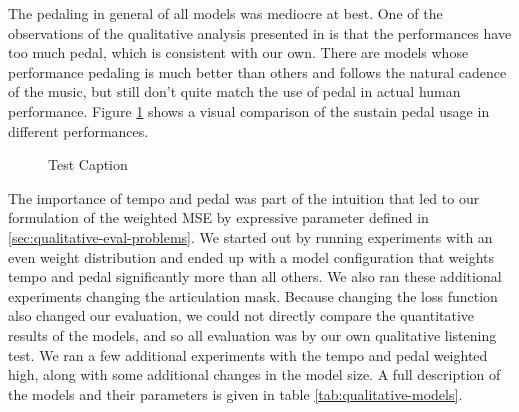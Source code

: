 The pedaling in general of all models was mediocre at best. One of the observations of the qualitative analysis presented in \cite{jeong2019virtuosonet} is that the performances have too much pedal, which is consistent with our own. There are models whose performance pedaling is much better than others and follows the natural cadence of the music, but still don't quite match the use of pedal in actual human performance. Figure \ref{fig:pedal-difference} shows a visual comparison of the sustain pedal usage in different performances. 

\begin{figure}
    \centering
    \caption{Test Caption}
    \label{fig:pedal-difference}
\end{figure}

The importance of tempo and pedal was part of the intuition that led to our formulation of the weighted MSE by expressive parameter defined in \ref{sec:qualitative-eval-problems}. We started out by running experiments with an even weight distribution and ended up with a model configuration that weights tempo and pedal significantly more than all others. We also ran these additional experiments changing the articulation mask. Because changing the loss function also changed our evaluation, we could not directly compare the quantitative results of the models, and so all evaluation was by our own qualitative listening test. We ran a few additional experiments with the tempo and pedal weighted high, along with some additional changes in the model size. A full description of the models and their parameters is given in table \ref{tab:qualitative-models}. 

\newcommand{\am}{$AM$}

